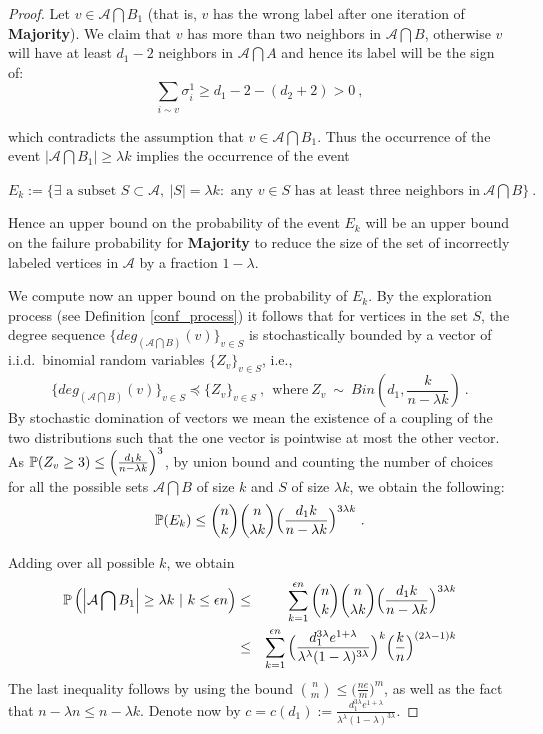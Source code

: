 \documentclass[11pt,reqno]{amsart}
\begin{document}
\begin{proof}
Let $v \in \mathcal{A}\bigcap B_1$ (that is, $v$ has the
wrong label after one iteration of \textbf{Majority}). We claim that $v$ has more than two neighbors in $\mathcal{A}\bigcap B$, otherwise $v$ will have at least $d_1-2$ neighbors in $\mathcal{A}\bigcap A$ and hence its label will be the sign of:
\[
\sum_{i\sim v} \sigma^1_i\geq d_1-2-(d_2+2)> 0~,
\] 

which contradicts the assumption that $v\in
\mathcal{A}\bigcap {B}_1$. 
Thus the occurrence of the event $\left | \mathcal{A}\bigcap {B}_1
\right | \geq \lambda k$ implies the occurrence of the event
\begin{center}
$E_k:=\{\exists \text{ a subset } S \subset \mathcal{A}, ~ |S|=\lambda k:  \mbox{ any } v\in S \mbox{ has at least three neighbors in}~ \mathcal{A}\bigcap B\}~.$
\end{center}

Hence an upper bound on the probability of the event $E_k$ will be an upper
bound on the failure probability for \textbf{Majority} to reduce
the size of the set of incorrectly labeled vertices in $\mathcal{A}$
by a fraction $1- \lambda$. 

We compute now an upper bound on the probability of $E_k$. 
By the exploration process (see Definition \ref{conf_process})  it follows that 
for vertices in the set $S$, the degree sequence $\{deg_{(\mathcal{A}\bigcap B)}(v)\}_{v \in S}$  is
stochastically bounded by a vector of i.i.d.\ binomial random
variables $\{Z_v\}_{v \in S}$, i.e.,
\[
\{deg_{(\mathcal{A}\bigcap B)}(v)\}_{v \in S} \preceq \{Z_v\}_{v \in S} ~, ~~\mbox{where}~ Z_v ~ {\sim}
~ Bin(d_1,\frac{k}{n-\lambda k})~.
\]
By stochastic domination of vectors we mean the existence of a coupling of the two distributions such that the one vector is pointwise at most the other vector. 
As $\P(Z_v\geq 3)\leq \left(\frac{d_1k}{n-\lambda k}\right)^3$, by
union bound and counting the number of choices for all the possible sets
$\mathcal{A}\bigcap B$ of size $k$ and $S$ of size $\lambda k$, we obtain
the following:
\[
\P(E_k)\leq \binom{n}{k}\binom{n}{\lambda k}\Big(\frac{d_1k}{n-\lambda k}\Big)^{3\lambda k}~.
\]


Adding over all possible $k$, we obtain
\begin{eqnarray} \label{bound1}
\P\left( \left | \mathcal{A}\bigcap {B}_1 \right | \geq \lambda
k~|~k\leq \epsilon n \right)& \leq & \sum_{k=1}^{\epsilon
  n}\binom{n}{k}\binom{n}{\lambda k}\Big(\frac{d_1k}{n-\lambda
  k}\Big)^{3\lambda k} \\
 &\leq & \sum_{k=1}^{\epsilon n} \Big(\frac{d_1^{3\lambda}e^{1+\lambda}}{\lambda^{\lambda}(1-\lambda)^{3\lambda}}\Big)^k\Big(\frac{k}{n}\Big)^{(2\lambda-1)k}
\end{eqnarray}
The last inequality follows by using the bound
$\binom{n}{m}\leq\Big(\frac{ne}{m}\Big)^m$, as well as the fact that
$n - \lambda n \leq n - \lambda k$. 
Denote now by $c= c(d_1) :=\frac{d_1^{3\lambda}e^{1+\lambda}}{\lambda^{\lambda}(1-\lambda)^{3\lambda}}$.


\end{proof}
\end{document}
